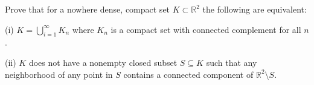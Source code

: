 Prove that for a nowhere dense, compact set $K\subset \mathbb{R}^2$ the following are equivalent:

(i) $K=\bigcup_{i=1}^{\infty}K_n$ where $K_n$ is a compact set with connected complement for all $n$.

(ii) $K$ does not have a nonempty closed subset $S\subseteq K$ such that any neighborhood of any point in $S$ contains a connected component of $\mathbb{R}^2 \setminus S$.